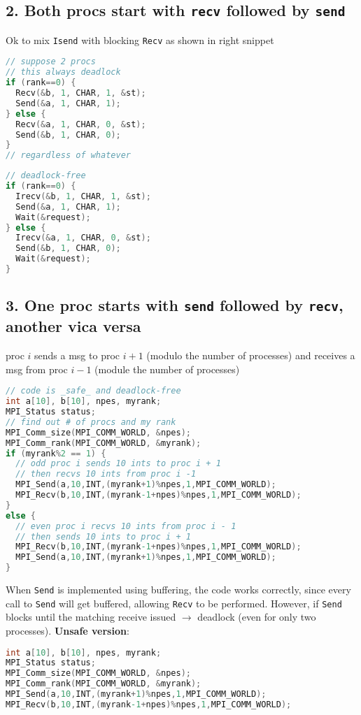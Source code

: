 \subsection*{2. Both procs start with \texttt{recv} followed by \texttt{send}}
Ok to mix \texttt{Isend} with blocking \texttt{Recv} as shown in right snippet\\
\begin{minipage}{0.5\linewidth}
\begin{lstlisting}[language=C,xleftmargin=2pt]
// suppose 2 procs
// this always deadlock
if (rank==0) {
  Recv(&b, 1, CHAR, 1, &st);
  Send(&a, 1, CHAR, 1);
} else {
  Recv(&a, 1, CHAR, 0, &st);
  Send(&b, 1, CHAR, 0);
}
// regardless of whatever
\end{lstlisting}
\end{minipage}
\begin{minipage}{0.5\linewidth}
\begin{lstlisting}[language=C,xleftmargin=2pt]
// deadlock-free
if (rank==0) {
  Irecv(&b, 1, CHAR, 1, &st);
  Send(&a, 1, CHAR, 1);
  Wait(&request);
} else {
  Irecv(&a, 1, CHAR, 0, &st);
  Send(&b, 1, CHAR, 0);
  Wait(&request);
}
\end{lstlisting}
\end{minipage}

% 
\subsection*{3. One proc starts with \texttt{send} followed by \texttt{recv}, another vica versa}
proc $i$ sends a msg to proc $i+1$ (modulo the number of processes) and receives a msg from proc $i-1$ (module the number of processes)
\begin{lstlisting}[language=C,xleftmargin=2pt,xrightmargin=0pt]
// code is _safe_ and deadlock-free
int a[10], b[10], npes, myrank;
MPI_Status status;
// find out # of procs and my rank
MPI_Comm_size(MPI_COMM_WORLD, &npes);
MPI_Comm_rank(MPI_COMM_WORLD, &myrank);
if (myrank%2 == 1) {
  // odd proc i sends 10 ints to proc i + 1
  // then recvs 10 ints from proc i -1
  MPI_Send(a,10,INT,(myrank+1)%npes,1,MPI_COMM_WORLD);
  MPI_Recv(b,10,INT,(myrank-1+npes)%npes,1,MPI_COMM_WORLD);
}
else {
  // even proc i recvs 10 ints from proc i - 1
  // then sends 10 ints to proc i + 1
  MPI_Recv(b,10,INT,(myrank-1+npes)%npes,1,MPI_COMM_WORLD);
  MPI_Send(a,10,INT,(myrank+1)%npes,1,MPI_COMM_WORLD);
}
\end{lstlisting}
When \texttt{Send} is implemented using buffering, the code works correctly, since every call to \texttt{Send} will get buffered, allowing \texttt{Recv} to be performed. However, if \texttt{Send} blocks until the matching receive issued $\rightarrow$ deadlock (even for only two processes). \textbf{Unsafe version}:
\begin{lstlisting}[language=C,xleftmargin=2pt,xrightmargin=0pt]
int a[10], b[10], npes, myrank;
MPI_Status status;
MPI_Comm_size(MPI_COMM_WORLD, &npes);
MPI_Comm_rank(MPI_COMM_WORLD, &myrank);
MPI_Send(a,10,INT,(myrank+1)%npes,1,MPI_COMM_WORLD);
MPI_Recv(b,10,INT,(myrank-1+npes)%npes,1,MPI_COMM_WORLD);
\end{lstlisting}
